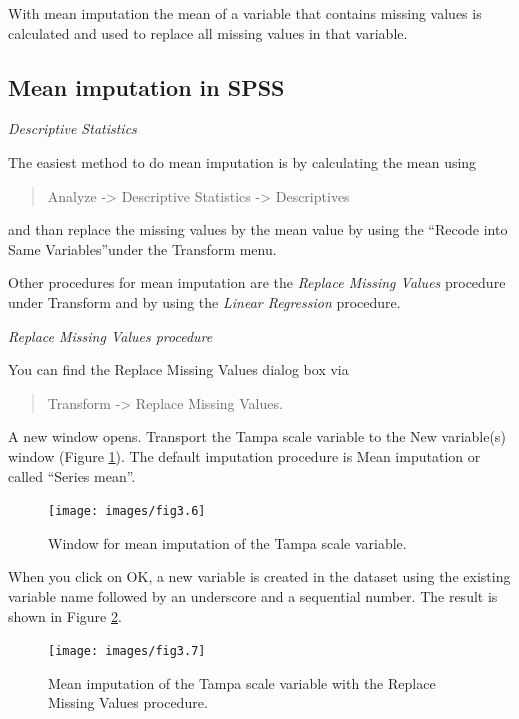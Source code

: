 \documentclass[
]{book}
\begin{document}
With mean imputation the mean of a variable that contains missing values is calculated and used to replace all missing values in that variable.

\hypertarget{mean-imputation-in-spss}{%
\subsection{Mean imputation in SPSS}\label{mean-imputation-in-spss}}

\emph{Descriptive Statistics}

The easiest method to do mean imputation is by calculating the mean using

\begin{quote}
Analyze -\textgreater{} Descriptive Statistics -\textgreater{} Descriptives
\end{quote}

and than replace the missing values by the mean value by using the ``Recode into Same Variables''under the Transform menu.

Other procedures for mean imputation are the \emph{Replace Missing Values} procedure under Transform and by using the \emph{Linear Regression} procedure.

\emph{Replace Missing Values procedure}

You can find the Replace Missing Values dialog box via

\begin{quote}
Transform -\textgreater{} Replace Missing Values.
\end{quote}

A new window opens. Transport the Tampa scale variable to the New variable(s) window (Figure \ref{fig:fig3-3}). The default imputation procedure is Mean imputation or called ``Series mean''.

\begin{figure}

{\centering \texttt{[image: images/fig3.6]} 

}

\caption{Window for mean imputation of the Tampa scale variable.}\label{fig:fig3-3}
\end{figure}

When you click on OK, a new variable is created in the dataset using the existing variable name followed by an underscore and a sequential number. The result is shown in Figure \ref{fig:fig3-7}.

\begin{figure}

{\centering \texttt{[image: images/fig3.7]} 

}

\caption{Mean imputation of the Tampa scale variable with the Replace Missing Values procedure.}\label{fig:fig3-7}
\end{figure}
\end{document}
